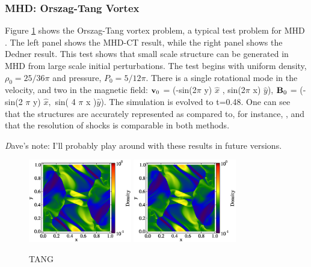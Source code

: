 \subsubsection{MHD: Orszag-Tang Vortex}
\label{sec.tests.mhd}
Figure \ref{fig.orszag} shows the Orszag-Tang vortex problem, a typical test
problem for MHD \citep{Orszag79}.  The left panel shows the MHD-CT result, while
the right panel shows the Dedner result.  This test shows that small scale structure
can be generated in MHD from large scale initial perturbations.  
The test begins 
with uniform density, $\rho_0=25/36 \pi$ and pressure, $P_0=5/12 \pi$.  There is
a single rotational mode in the velocity, and two in the magnetic field: 
${\bf v}_0 $ = (-sin(2$\pi$ y) $ \hat{x}$ , sin(2$\pi$ x) $\hat{y}$),
${\bf B}_0$  =  (-sin(2 $\pi$ y) $ \hat{x},$ sin( 4 $\pi$ x )$\hat{y}$).  The
simulation is evolved to t=0.48.  One can see that the structures are accurately
represented as compared to, for instance, \citet{Toth00}, and that the
resolution of shocks is comparable in both methods.  

{\emph Dave's note:  I'll probably play around with these results in future
versions.}

\begin{figure}
\begin{center}
\includegraphics[width=0.4\textwidth]{figures/MHDCT_OrszagTang_Density.eps}
\includegraphics[width=0.4\textwidth]{figures/MHDDedner_OrszagTang_Density.eps}
\caption{TANG}
\label{fig.orszag}
\end{center}
\end{figure}


